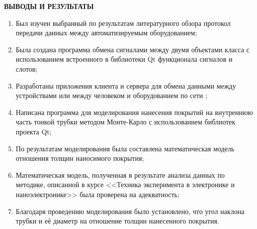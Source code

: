 \documentclass[../AISTR.tex]{subfiles}
\begin{document}
\begin{center}
	\normalsize\bfseries\MakeUppercase{выводы и результаты}
\end{center}
\begin{enumerate}
	\item Был изучен выбранный по результатам литературного обзора протокол передачи данных между автоматизируемым оборудованием;
	\item Была создана программа обмена сигналами между двумя объектами класса с использованием встроенного в библиотеки Qt функционала сигналов и слотов;
	\item Разработаны приложения клиента и сервера для обмена данными между устройствами или между человеком и оборудованием по сети \tcp;
	\item Написана программа для моделирования нанесения покрытий на внутреннюю часть тонкой трубки методом Монте-Карло с использованием библиотек проекта Qt;
	\item По результатам моделирования была составлена математическая модель отношения толщин наносимого покрытия;
	\item Математическая модель, полученная в результате анализа данных по методике, описанной в курсе <<Техника эксперимента в электронике и наноэлектронике>> была проверена на адекватность;
	\item Благодаря проведению моделирования было установлено, что угол наклона трубки и её диаметр на отношение толщин нанесенного покрытия.
\end{enumerate}
\end{document}
